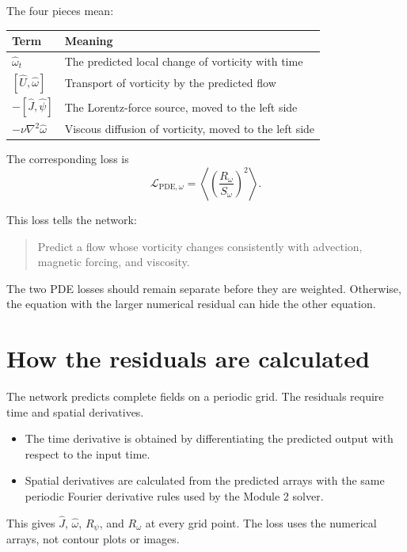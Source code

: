 \documentclass[11pt]{article}
\newcommand{\bracket}[2]{\left[#1,#2\right]}
\newcommand{\avg}[1]{\left\langle #1\right\rangle}
\newcommand{\Rpsi}{R_{\psi}}
\newcommand{\Romega}{R_{\omega}}
\newcommand{\Lpdeomega}{\mathcal L_{\mathrm{PDE},\omega}}
\begin{document}
The four pieces mean:
\begin{center}
\begin{tabularx}{0.94\textwidth}{>{\bfseries}p{} X}
\toprule
Term & Meaning\\
\midrule
$\widehat\omega_t$ & The predicted local change of vorticity with time\\
$\bracket{\widehat U}{\widehat\omega}$ & Transport of vorticity by the predicted flow\\
$-\bracket{\widehat J}{\widehat\psi}$ & The Lorentz-force source, moved to the left side\\
$-\nu\nabla^2\widehat\omega$ & Viscous diffusion of vorticity, moved to the left side\\
\bottomrule
\end{tabularx}
\end{center}

The corresponding loss is
\begin{equation}
\boxed{
\Lpdeomega=\avg{\left(\frac{\Romega}{S_{\omega}}\right)^2}.
}
\label{eq:lpdeomega}
\end{equation}

This loss tells the network:
\begin{quote}
Predict a flow whose vorticity changes consistently with advection, magnetic forcing, and viscosity.
\end{quote}

The two PDE losses should remain separate before they are weighted. Otherwise, the equation with the larger numerical residual can hide the other equation.

\section{How the residuals are calculated}

The network predicts complete fields on a periodic grid. The residuals require time and spatial derivatives.

\begin{itemize}[leftmargin=2em]
\item The time derivative is obtained by differentiating the predicted output with respect to the input time.
\item Spatial derivatives are calculated from the predicted arrays with the same periodic Fourier derivative rules used by the Module 2 solver.
\end{itemize}

This gives $\widehat J$, $\widehat\omega$, $\Rpsi$, and $\Romega$ at every grid point. The loss uses the numerical arrays, not contour plots or images.
\end{document}
